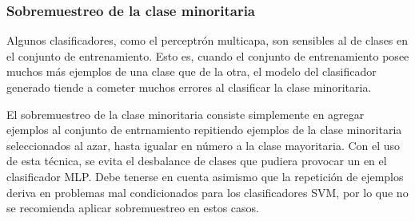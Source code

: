 %
\subsubsection{Sobremuestreo de la clase minoritaria}
%
Algunos clasificadores, como el perceptrón multicapa, son sensibles
al  de clases en el conjunto de entrenamiento.
Esto es, cuando el conjunto de entrenamiento posee muchos más ejemplos
de una clase que de la otra, el modelo del clasificador generado
tiende a cometer muchos errores al clasificar la clase minoritaria.

El sobremuestreo de la clase minoritaria consiste simplemente en
agregar ejemplos al conjunto de entrnamiento repitiendo ejemplos de la
clase minoritaria seleccionados al azar, hasta igualar en número a la
clase mayoritaria.
Con el uso de esta técnica, se evita el desbalance de clases que
pudiera provocar un  en el clasificador MLP.
Debe tenerse en cuenta asimismo que la repetición de ejemplos deriva
en problemas mal condicionados para los clasificadores SVM, por lo que
no se recomienda aplicar sobremuestreo en estos casos.
